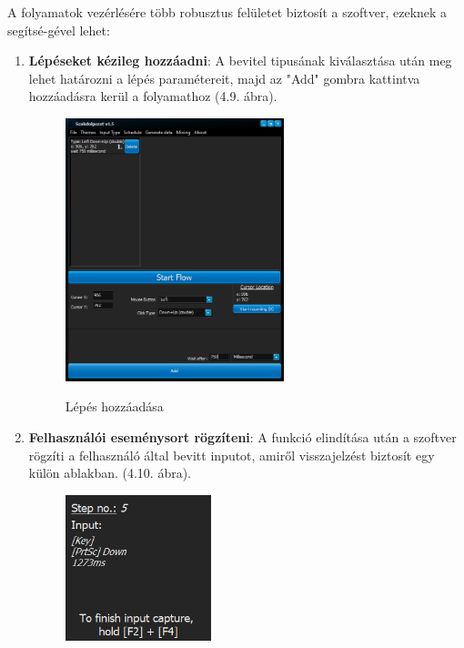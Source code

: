 A folyamatok vezérlésére több robusztus felületet biztosít a szoftver, ezeknek a segítsé\hyp{}gével lehet:
\begin{enumerate}
	\item{
		\textbf{Lépéseket kézileg hozzáadni}: A bevitel tipusának kiválasztása után meg lehet határozni a lépés paramétereit, majd az "Add" gombra kattintva hozzáadásra kerül a folyamathoz (4.9. ábra).
		\begin{figure}[h!]
			\begin{center}
				\includegraphics[width=0.6\textwidth, keepaspectratio=true]{images/img_flow_add}\\
				\caption{Lépés hozzáadása}
				\label{fig:example}
			\end{center}
		\end{figure}
	}
	\item{
		\textbf{Felhasználói eseménysort rögzíteni}: A funkció elindítása után a szoftver rögzíti a felhasználó által bevitt inputot, amiről visszajelzést biztosít egy külön ablakban. (4.10. ábra).
		\begin{figure}[h!]
			\begin{center}
				\includegraphics[width=0.4\textwidth, keepaspectratio=true]{images/img_flow_capture}\\

\end{center}
\end{figure}}
\end{enumerate}

